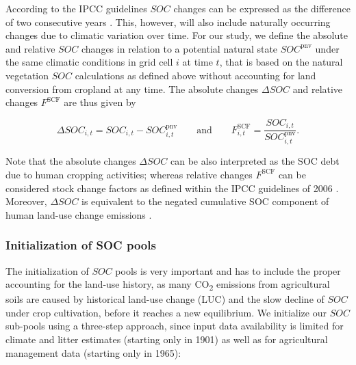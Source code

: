 \documentclass[gc, manuscript]{copernicus}
\begin{document}
According to the IPCC guidelines \(SOC\) changes can be expressed as the difference of two consecutive years \citep[see Eq. 5.0A in][]{ogle_cropland_in_ipcc_2019}. This, however, will also include naturally occurring changes due to climatic variation over time. For our study, we define the absolute and relative \(SOC\) changes in relation to a potential natural state \(SOC^{\mathrm{pnv}}\) under the same climatic conditions in grid cell \(i\) at time \(t\), that is based on the natural vegetation \(SOC\) calculations as defined above without accounting for land conversion from cropland at any time. The absolute changes \(\Delta SOC\) and relative changes \(F^{\mathrm{SCF}}\) are thus given by

\begin{equation}
\Delta SOC_{i,t} = SOC_{i,t} - SOC^{\mathrm{pnv}}_{i,t}\qquad \text{and} \qquad  F^{\mathrm{SCF}}_{i,t} = \frac{SOC_{i,t}}{SOC^{\mathrm{pnv}}_{i,t}} .
\label{eq:stockdiff}
\end{equation}

Note that the absolute changes \(\Delta SOC\) can be also interpreted as the SOC debt \citep{sanderman_soil_2017} due to human cropping activities; whereas relative changes \(F^{\mathrm{SCF}}\) can be considered stock change factors as defined within the IPCC guidelines of 2006 \citep{eggleston_ipcc_2006}. Moreover, \(\Delta SOC\) is equivalent to the negated cumulative SOC component of human land-use change emissions \citep{pugh_simulated_2015}.

\hypertarget{sec:initsoc}{%
\subsubsection{Initialization of SOC pools}\label{sec:initsoc}}

The initialization of \(SOC\) pools is very important and has to include the proper accounting for the land-use history, as many CO\textsubscript{2} emissions from agricultural soils are caused by historical land-use change (LUC) and the slow decline of \(SOC\) under crop cultivation, before it reaches a new equilibrium.
We initialize our \(SOC\) sub-pools using a three-step approach, since input data availability is limited for climate and litter estimates (starting only in 1901) as well as for agricultural management data (starting only in 1965):
\end{document}
